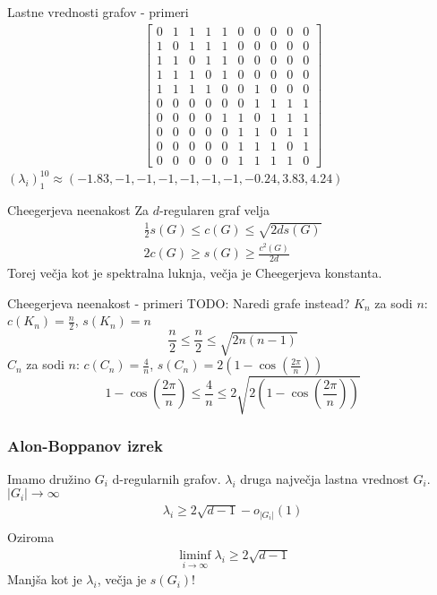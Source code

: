 \documentclass{beamer}
\begin{document}
\begin{frame}{Lastne vrednosti grafov - primeri}
    \begin{align*}
        \begin{bmatrix}
            0 & 1 & 1 & 1 & 1 & 0 & 0 & 0 & 0 & 0 \\
            1 & 0 & 1 & 1 & 1 & 0 & 0 & 0 & 0 & 0 \\
            1 & 1 & 0 & 1 & 1 & 0 & 0 & 0 & 0 & 0 \\
            1 & 1 & 1 & 0 & 1 & 0 & 0 & 0 & 0 & 0 \\
            1 & 1 & 1 & 1 & 0 & 0 & 1 & 0 & 0 & 0 \\
            0 & 0 & 0 & 0 & 0 & 0 & 1 & 1 & 1 & 1 \\
            0 & 0 & 0 & 0 & 1 & 1 & 0 & 1 & 1 & 1 \\
            0 & 0 & 0 & 0 & 0 & 1 & 1 & 0 & 1 & 1 \\
            0 & 0 & 0 & 0 & 0 & 1 & 1 & 1 & 0 & 1 \\
            0 & 0 & 0 & 0 & 0 & 1 & 1 & 1 & 1 & 0
        \end{bmatrix}
    \end{align*}
    \((\lambda_i)_1^{10} \approx (-1.83, -1, -1, -1, -1, -1, -1, -0.24, 3.83, 4.24)\)
\end{frame}
\begin{frame}{Cheegerjeva neenakost}
    Za \(d\)-regularen graf velja
    \begin{align*}
        \frac{1}{2}s(G)\leq c(G) \leq \sqrt{2d s(G)} \\
        2c(G) \geq s(G) \geq \frac{c^2(G)}{2d}
    \end{align*}
    Torej večja kot je spektralna luknja, večja je Cheegerjeva konstanta.
\end{frame}
\begin{frame}{Cheegerjeva neenakost - primeri}
    TODO: Naredi grafe instead?
    \(K_n\) za sodi \(n\): \(c(K_n) = \frac{n}{2}\), \(s(K_n) = n\)
    \[
        \frac{n}{2} \leq \frac{n}{2} \leq \sqrt{2n(n-1)}
    \]
    \(C_n\) za sodi \(n\): \(c(C_n) = \frac{4}{n}\), \(s(C_n) = 2\left(1-\cos\left(\frac{2\pi}{n}\right)\right)\)
    \[
        1-\cos\left(\frac{2\pi}{n}\right) \leq \frac{4}{n} \leq 2\sqrt{2\left(1-\cos\left(\frac{2\pi}{n}\right)\right)}
    \]
\end{frame}
\begin{frame}
    \frametitle{Alon-Boppanov izrek}
    Imamo družino \(G_i\) d-regularnih grafov. \(\lambda_i\) druga največja lastna vrednost \(G_i\). \(|G_i| \to \infty\)
    \begin{align*}
        \lambda_i \geq 2\sqrt{d-1} -o_{|G_i|}(1) \\
    \end{align*}
    Oziroma
    \begin{align*}
        \liminf_{i\to\infty} \lambda_i \geq 2\sqrt{d-1}
    \end{align*}
    Manjša kot je \(\lambda_i\), večja je \(s(G_i)\)!
\end{frame}
\end{document}

